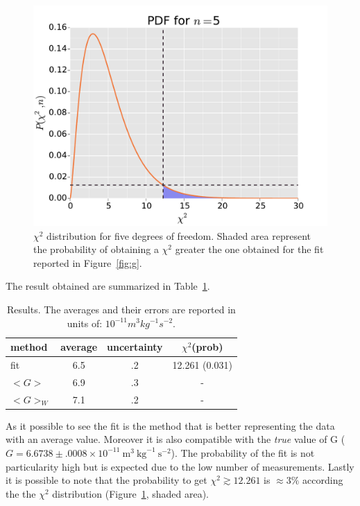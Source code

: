 \documentclass[twocolumn]{article}
\begin{document}
	\begin{figure}[h!]
		\begin{center}
			\includegraphics[width=.4 \textwidth]{fig/xpdf.pdf}
		\end{center}
		\caption{$\chi^2$ distribution for five degrees of freedom. Shaded area represent the probability of obtaining a $\chi^2$ greater the one obtained for the fit reported in Figure~\ref{fig:g}.}
		\label{fig:xpdf}
	\end{figure}
	The result obtained are summarized in Table~\ref{tab:res}.

	\begin{table}[htpb]
		\caption{Results. The averages and their errors are reported in units of: $10^{-11} m^3 kg^{-1} s^{-2}$.}
		\label{tab:res}
		\begin{center}
			\begin{tabular}{l|ccc}
			\hline

			\hline
			\textbf{method} & \textbf{average} & \textbf{uncertainty} & \textbf{$\chi ^2 $(prob)} \\
			\hline
			fit & 6.5 & .2 & 12.261 (0.031) \\
			$<G> $ & 6.9 & .3 & - \\
			$<G>_W$ &  7.1 & .2 & - \\
			\hline
			\hline
			\end{tabular}
		\end{center}
	\end{table}

	As it possible to see the fit is the method that is better representing the data with an average value.
	Moreover it is also compatible with the \emph{true} value of G ($ G = 6.6738 \pm .0008  \times 10^{-11} \ \mbox{m}^3 \ \mbox{kg}^{-1} \ \mbox{s}^{-2} $).
	The probability of the fit is not particularity high but is expected due to the low number of measurements.
	Lastly it is possible to note that the probability to get $\chi ^2 \gtrsim 12.261 $ is $ \approx 3 \% $ according the the $\chi ^2$ distribution (Figure~\ref{fig:xpdf}, shaded area).
\end{document}
